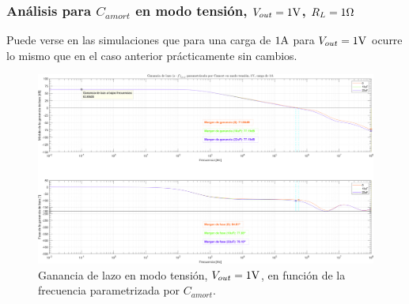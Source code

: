 \clearpage


\subsubsection{Análisis para $C_{amort}$ en modo tensión, $V_{out} = 1 \si[per-mode=symbol]{\volt}$, $R_{L} = 1 \si[per-mode=symbol]{\ohm}$}

Puede verse en las simulaciones que para una carga de $1 \si[per-mode=symbol]{\ampere} $ para $V_{out} = 1 \si[per-mode=symbol]{\volt}$ ocurre lo mismo que en el caso anterior prácticamente sin cambios.

\vfill



\clearpage

\begin{figure}[H] %
\begin{center}
\includegraphics[width=1.1 \textwidth, angle=90]{./img/plots/loop/power_supply_CAMORT_LOOP_Modo2.png}
\caption{\label{fig:fig_power_supply_CAMORT_LOOP_Modo2}\footnotesize{Ganancia de lazo en modo tensión, $V_{out} = 1 \si[per-mode=symbol]{\volt}$, en función de la frecuencia parametrizada por $C_{amort}$.}}
\end{center}
\end{figure}


\clearpage

